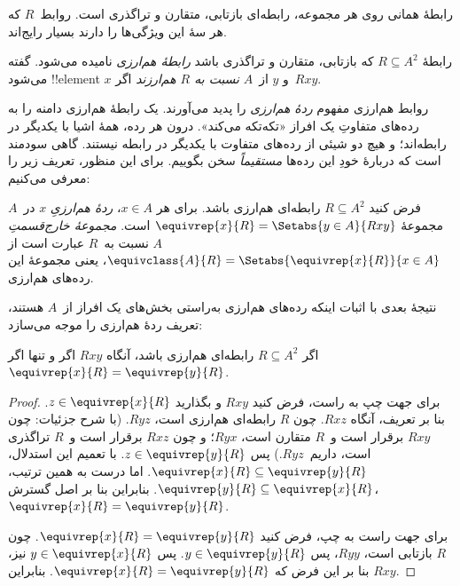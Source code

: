 \documentclass[../../../include/open-logic-section]{subfiles}
\begin{document}


رابطهٔ همانی روی هر مجموعه، رابطه‌ای بازتابی، متقارن و تراگذری است. روابط~$R$
که هر سهٔ این ویژگی‌ها را دارند بسیار رایج‌اند.

\begin{defn}
رابطهٔ $R \subseteq A^2$ که بازتابی، متقارن و تراگذری باشد
\emph{رابطهٔ هم‌ارزی} نامیده می‌شود. گفته می‌شود !!{element} $x$
و $y$ از~$A$ \emph{نسبت به $R$ هم‌ارزند} اگر~$Rxy$.
\end{defn}

روابط هم‌ارزی مفهوم \emph{ردهٔ هم‌ارزی} را پدید می‌آورند. یک رابطهٔ
هم‌ارزی دامنه را به رده‌های متفاوتِ یک افراز «تکه‌تکه می‌کند». درون هر
رده، همهٔ اشیا با یکدیگر در رابطه‌اند؛ و هیچ دو شیئی از رده‌های متفاوت
با یکدیگر در رابطه نیستند. گاهی سودمند است که دربارهٔ خودِ این رده‌ها
\emph{مستقیماً} سخن بگوییم. برای این منظور، تعریف زیر را معرفی می‌کنیم:

\begin{defn}
فرض کنید $R \subseteq A^2$ رابطه‌ای هم‌ارزی باشد. برای هر $x \in A$،
\emph{ردهٔ هم‌ارزیِ} $x$ در~$A$ مجموعهٔ $\equivrep{x}{R}
= \Setabs{y \in A}{Rxy}$ است. \emph{مجموعهٔ خارج‌قسمتِ} $A$ نسبت
به~$R$ عبارت است از
$\equivclass{A}{R} = \Setabs{\equivrep{x}{R}}{x \in A}$، یعنی مجموعهٔ
این رده‌های هم‌ارزی.
\end{defn}

نتیجهٔ بعدی با اثبات اینکه رده‌های هم‌ارزی به‌راستی بخش‌های یک افراز از~$A$
هستند، تعریف ردهٔ هم‌ارزی را موجه می‌سازد:

\begin{prop}
اگر $R \subseteq A^2$ رابطه‌ای هم‌ارزی باشد، آنگاه $Rxy$ اگر و تنها اگر
$\equivrep{x}{R} = \equivrep{y}{R}$.
\end{prop}

\begin{proof}
برای جهت چپ به راست، فرض کنید $Rxy$ و بگذارید $z \in
\equivrep{x}{R}$. بنا بر تعریف، آنگاه $Rxz$. چون $R$ رابطه‌ای هم‌ارزی
است، $Ryz$. (با شرح جزئیات: چون $Rxy$ برقرار است و~$R$ متقارن است، $Ryx$؛
و چون $Rxz$ برقرار است و~$R$ تراگذری است، داریم~$Ryz$.) پس
$z \in \equivrep{y}{R}$. با تعمیم
این استدلال، $\equivrep{x}{R} \subseteq \equivrep{y}{R}$. اما درست به
همین ترتیب، $\equivrep{y}{R} \subseteq \equivrep{x}{R}$. بنابراین بنا
بر اصل گسترش، $\equivrep{x}{R} =
\equivrep{y}{R}$.

برای جهت راست به چپ، فرض کنید $\equivrep{x}{R} =
\equivrep{y}{R}$. چون $R$ بازتابی است، $Ryy$، پس $y \in
\equivrep{y}{R}$. پس $y \in \equivrep{x}{R}$ نیز، بنا بر این فرض که
$\equivrep{x}{R} = \equivrep{y}{R}$. بنابراین $Rxy$.
\end{proof}
\end{document}
